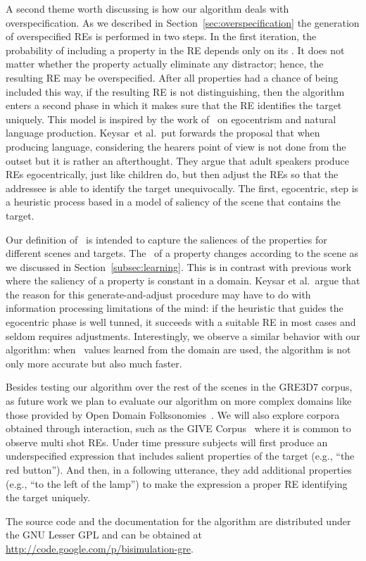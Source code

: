 A second theme worth discussing is how our algorithm deals with overspecification. As we described in Section~\ref{sec:overspecification} the generation of overspecified REs is performed in two steps. In the first iteration, the probability of including a property in the RE depends only on its \puse. It does not matter whether the property actually eliminate any distractor; hence, the resulting RE may be overspecified. After all properties had a chance of being included this way, if the resulting RE is not distinguishing, then the algorithm enters a second phase in which it makes sure that the RE identifies the target uniquely.  This model is inspired by the work of~ on egocentrism and natural language production.  Keysar~et al.\ put forwards the proposal that when producing language, considering the hearers point of view is not done from the outset but it is rather an afterthought. They argue that adult speakers produce REs egocentrically, just like children do, but then adjust the REs so that the addressee is able to identify the target unequivocally. The first, egocentric, step is a heuristic process based in a model of saliency of the scene that contains the target. 

Our definition of \puse\ is intended to capture the saliences of the properties for different scenes and targets. The \puse\ of a property changes according to the scene as we discussed in Section~\ref{subsec:learning}. This is in contrast with previous work where the saliency of a property is constant in a domain. Keysar et al.~argue that the reason for this generate-and-adjust procedure may have to do with information processing limitations of the mind: if the heuristic that guides the egocentric phase is well tunned, it succeeds with a suitable RE in most cases and seldom requires adjustments. Interestingly, we observe a similar behavior with our algorithm: when \puse\ values learned from the domain are used, the algorithm is not only more accurate but also much faster. 

Besides testing our algorithm over the rest of the scenes in the GRE3D7 corpus, as future work we plan to evaluate our algorithm on more complex domains like those provided by Open Domain Folksonomies~\cite{pacheco-duboue-dominguez:2012:NAACL-HLT}. We will also explore corpora obtained through interaction, such as the GIVE Corpus~\cite{GarGarKolStr10} where it is common to observe multi shot REs. Under time pressure subjects will first produce an underspecified expression that includes salient properties of the target (e.g., ``the red button'').  And then, in a following utterance, they add additional properties (e.g., ``to the left of the lamp'') to make the expression a proper RE  identifying the target uniquely.

The source code and the documentation for the algorithm are distributed under the GNU Lesser GPL and can be obtained at \url{http://code.google.com/p/bisimulation-gre}.
